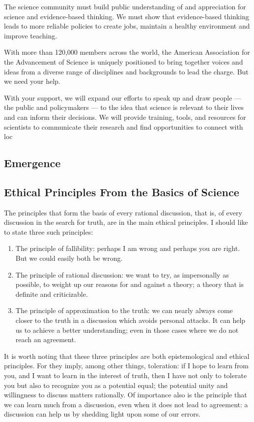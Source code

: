 The science community must build public understanding of and appreciation for science and evidence-based thinking. We must show that evidence-based thinking leads to more reliable policies to create jobs, maintain a healthy environment and improve teaching.

With more than 120,000 members across the world, the American Association for the Advancement of Science is uniquely positioned to bring together voices and ideas from a diverse range of disciplines and backgrounds to lead the charge. But we need your help.

With your support, we will expand our efforts to speak up and draw people — the public and policymakers — to the idea that science is relevant to their lives and can inform their decisions. We will provide training, tools, and resources for scientists to communicate their research and find opportunities to connect with loc

\subsection{Emergence}

\subsection{Ethical Principles From the Basics of Science}

The principles that form the basis of every rational discussion, that is, of every discussion in the search for truth, are in the main ethical principles. I should like to state three such principles:

\begin{enumerate}
\item The principle of fallibility: perhaps I am wrong and perhaps you are right. But we could easily both be wrong.
\item The principle of rational discussion: we want to try, as impersonally as possible, to weight up our reasons for and against a theory; a theory that is definite and criticizable.
\item The principle of approximation to the truth: we can nearly always come closer to the truth in a discussion which avoids personal attacks. It can help us to achieve a better understanding; even in those cases where we do not reach an agreement.
\end{enumerate}

It is worth noting that these three principles are both epistemological and ethical principles. For they imply, among other things, toleration: if I hope to learn from you, and I want to learn in the interest of truth, then I have not only to tolerate you but also to recognize you as a potential equal; the potential unity and willingness to discuss matters rationally. Of importance also is the principle that we can learn much from a discussion, even when it does not lead to agreement: a discussion can help us by shedding light upon some of our errors.

